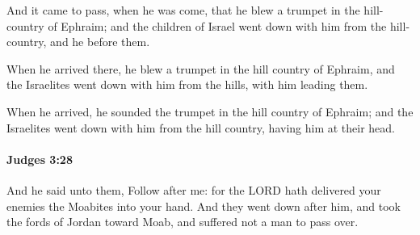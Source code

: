 			\begin{versebox}
					\item[BHS] 
					\item[ASV] And it came to pass, when he was come, that he blew a trumpet in the hill-country of Ephraim; and the children of Israel went down with him from the hill-country, and he before them.
					\item[NIV] When he arrived there, he blew a trumpet in the hill country of Ephraim, and the Israelites went down with him from the hills, with him leading them.
					\item[NRSV] When he arrived, he sounded the trumpet in the hill country of Ephraim; and the Israelites went down with him from the hill country, having him at their head.
			\end{versebox}

		\paragraph{Judges 3:28} %
			\label{JUDGES-3-28}

			And he said unto them, Follow after me: for the LORD hath delivered your enemies the Moabites into your hand. And they went down after him, and took the fords of Jordan toward Moab, and suffered not a man to pass over.

